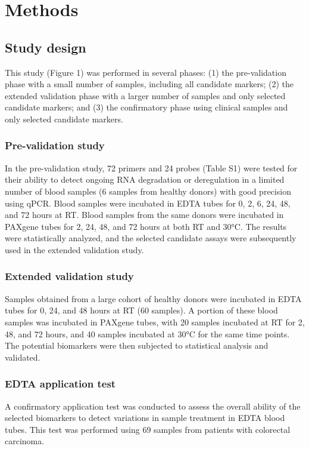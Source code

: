 \documentclass[fleqn,10pt]{wlscirep}
\begin{document}
\section*{Methods}
\subsection*{Study design}
This study (Figure 1) was performed in several phases: (1) the pre-validation phase with a small number of samples,  including all candidate markers; (2) the extended validation phase with a larger number of samples and only selected candidate markers; and (3) the confirmatory phase using clinical samples and only selected candidate markers. 

\subsubsection*{Pre-validation study}
In the pre-validation study, 72 primers and 24 probes (Table S1) were tested for their ability to detect ongoing RNA degradation or deregulation in a limited number of blood samples (6 samples from healthy donors) with good precision using qPCR. Blood samples were incubated in EDTA tubes for 0, 2, 6, 24, 48, and 72 hours at RT. Blood samples from the same donors were incubated in PAXgene tubes for 2, 24, 48, and 72 hours at both RT and 30°C. The results were statistically analyzed, and the selected candidate assays were subsequently used in the extended validation study.

\subsubsection*{Extended validation study}
Samples obtained from a large cohort of healthy donors were incubated in EDTA tubes for 0, 24, and 48 hours at RT (60 samples). A portion of these blood samples was incubated in PAXgene tubes, with 20 samples incubated at RT for 2, 48, and 72 hours, and 40 samples incubated at 30°C for the same time points. The potential biomarkers were then subjected to statistical analysis and validated.

\subsubsection*{EDTA application test}
A confirmatory application test was conducted to assess the overall ability of the selected biomarkers to detect variations in sample treatment in EDTA blood tubes. This test was performed using 69 samples from patients with colorectal carcinoma.
\end{document}
